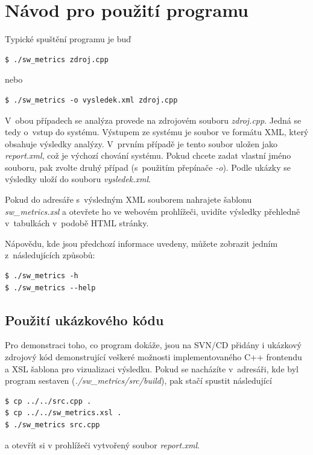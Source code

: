 \documentclass[11pt,twoside,a4paper]{book}
\begin{document}
\section{Návod pro použití programu}
Typické spuštění programu je buď
\begin{verbatim}
$ ./sw_metrics zdroj.cpp
\end{verbatim}
nebo
\begin{verbatim}
$ ./sw_metrics -o vysledek.xml zdroj.cpp
\end{verbatim}
V~obou případech se analýza provede na zdrojovém souboru \textit{zdroj.cpp}. Jedná se tedy o~vstup do systému.
Výstupem ze systému je soubor ve formátu XML, který obsahuje výsledky analýzy. V~prvním případě
je tento soubor uložen jako \textit{report.xml}, což je výchozí chování systému. Pokud chcete
zadat vlastní jméno souboru, pak zvolte druhý případ (s~použitím přepínače \textit{-o}). Podle ukázky
se výsledky uloží do souboru \textit{vysledek.xml}.

Pokud do adresáře s~výsledným XML souborem nahrajete šablonu \textit{sw\_metrics.xsl} a otevřete ho ve
webovém prohlížeči, uvidíte výsledky přehledně v~tabulkách v~podobě HTML stránky.

Nápovědu, kde jsou předchozí informace uvedeny, můžete zobrazit jedním z~následujících způsobů:
\begin{verbatim}
$ ./sw_metrics -h
$ ./sw_metrics --help
\end{verbatim}

\subsection{Použití ukázkového kódu}
Pro demonstraci toho, co program dokáže, jsou na SVN/CD přidány i ukázkový zdrojový kód demonstrující veškeré možnosti
implementovaného C++ frontendu a XSL šablona pro vizualizaci výsledku.
Pokud se nacházíte v~adresáři, kde byl program sestaven (\textit{./sw\_metrics/src/build}), pak stačí spustit následující
\begin{verbatim}
$ cp ../../src.cpp .
$ cp ../../sw_metrics.xsl .
$ ./sw_metrics src.cpp
\end{verbatim}
a otevřít si v prohlížeči vytvořený soubor \textit{report.xml}.

\end{document}
